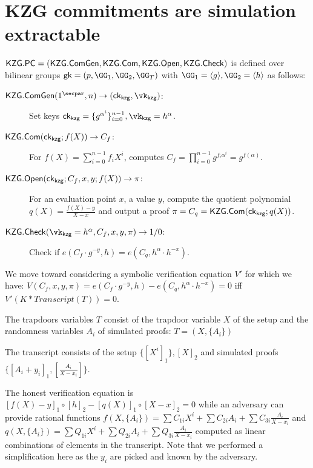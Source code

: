 \documentclass[runningheads,11pt]{llncs}
\begin{document}
\def\open{{\sf Open}}
\def\check{{\sf Check}}
\def\gk{{\sf gk}}

\def\ck{{\sf ck}}
\newcommand{\secp}{\lambda}

\section{KZG commitments are simulation extractable}
$\Kzg.\PC = (\Kzg.\cgen,\Kzg.\CM,\allowbreak  \Kzg.\open,\allowbreak \Kzg.\check)$ is defined over bilinear groups $\gk=(p,\GG_1,\allowbreak \GG_2, \allowbreak \GG_T )$ with $\GG_1 =\langle g\rangle, \GG_2 =\langle h \rangle$ as follows:
\begin{description}%
\item[$\Kzg.\cgen(1^\secpar, n) \to (\ck_\kzg, \vk_\kzg)$:] Set keys
$\ck_\kzg = \{g^{\alpha^i}\}_{i=0}^{n-1}, \allowbreak\vk_\kzg = h^\alpha$.
\item[$\Kzg.\CM(\ck_\kzg; f(X)) \to C_f$:]  For $f(X) = \sum_{i=0}^{n-1} f_i X^i$, computes  $C_f=\prod _{i=0}^{n-1} g^{f_i \alpha^i} = g^{f(\alpha)} $.
\item[$\Kzg.\open(\ck_\kzg; C_f, x, y; f(X)) \to \pi$:] For an evaluation point $x$, a value $y$, compute the quotient  polynomial $q(X) = \displaystyle\frac{f(X) -y }{X-x}$ and output a proof $\pi = C_q = \Kzg.\CM(\ck_\kzg; q(X)) $.
\item[$\Kzg.\check(\vk_\kzg = h^\alpha, C_f, x, y, \pi) \to 1/0$:] Check if $e(C_f \cdot  g^{-y}, h)=e(C_q , h^{\alpha}\cdot h^{-x})$.
\end{description}

We move toward considering a symbolic verification equation $V'$ for which we have:
$V(C_{f},x,y,\pi) =  e(C_f \cdot  g^{-y}, h) - e(C_q , h^{\alpha}\cdot h^{-x}) = 0$ iff $V'(K * Transcript (T)) = 0$.

The trapdoors variables $T$ consist of the trapdoor variable $X$ of the setup and the randomness variables $A_{i}$ of simulated proofs:
$T=(X, \{A_{i}\})$

The transcript consists of the setup $\{[X^{i}]_{1}\}, [X]_{2}$ and simulated proofs $\{[A_{i} + y_{i}]_{1}, [\frac{A_{i}}{X-x_{i}}]\}$.

The honest verification equation is
$[f(X) - y]_1 \circ [h]_{2} - [q(X)]_1 \circ [X-x]_{2}=0$ while an adversary can
provide rational functions
$f(X, \{A_{i}\}) = \sum C_{1i} X^{i} + \sum C_{2i} A_{i} + \sum C_{3i}
\frac{A_{i}}{X-x_{i}}$ and
$q(X, \{A_{i}\}) = \sum Q_{1i} X^{i} + \sum Q_{2i} A_{i} + \sum Q_{3i}
\frac{A_{i}}{X-x_{i}}$ computed as linear combinations of elements in the
transcript. Note that we performed a simplification here as the $y_{i}$ are
picked and known by the adversary.
\end{document}
